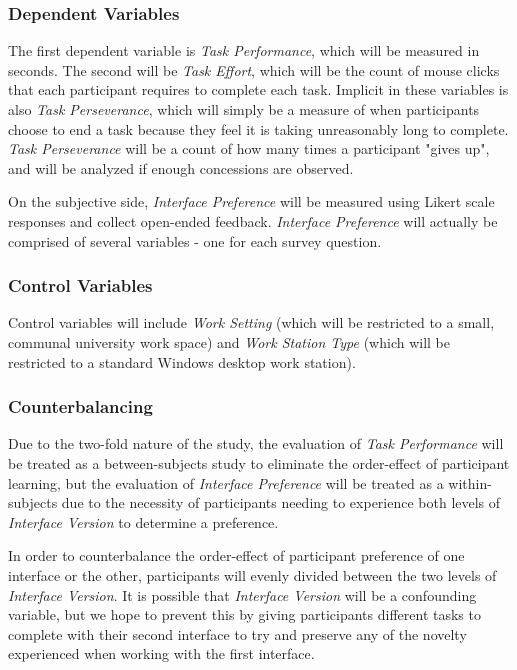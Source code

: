 \documentclass{article}
\begin{document}
\subsubsection{Dependent Variables}
The first dependent variable is \emph{Task Performance}, which will be measured in seconds. The second will be \emph{Task Effort}, which will be the count of mouse clicks that each participant requires to complete each task. Implicit in these variables is also \emph{Task Perseverance}, which will simply be a measure of when participants choose to end a task because they feel it is taking unreasonably long to complete. \emph{Task Perseverance} will be a count of how many times a participant "gives up", and will be analyzed if enough concessions are observed.

On the subjective side, \emph{Interface Preference} will be measured using Likert scale responses and collect open-ended feedback. \emph{Interface Preference} will actually be comprised of several variables - one for each survey question.

\subsubsection{Control Variables}
Control variables will include \emph{Work Setting} (which will be restricted to a small, communal university work space) and \emph{Work Station Type} (which will be restricted to a standard Windows desktop work station).

\subsubsection{Counterbalancing}
Due to the two-fold nature of the study, the evaluation of \emph{Task Performance} will be treated as a between-subjects study to eliminate the order-effect of participant learning, but the evaluation of \emph{Interface Preference} will be treated as a within-subjects due to the necessity of participants needing to experience both levels of \emph{Interface Version} to determine a preference.

In order to counterbalance the order-effect of participant preference of one interface or the other, participants will evenly divided between the two levels of \emph{Interface Version}. It is possible that \emph{Interface Version} will be a confounding variable, but we hope to prevent this by giving participants different tasks to complete with their second interface to try and preserve any of the novelty experienced when working with the first interface.
\end{document}

